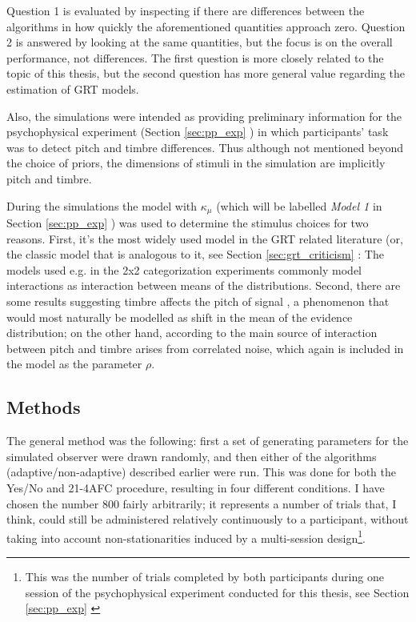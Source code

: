 \documentclass{article}\usepackage{knitr}
\begin{document}
Question 1 is evaluated by inspecting if there are differences between the algorithms in how quickly the aforementioned quantities approach zero. Question 2 is answered by looking at the same  quantities, but the focus is on the overall performance, not differences. The first question is more closely related to the topic of this thesis, but the second question has more general value regarding the estimation of GRT models. 

Also, the simulations were intended as providing preliminary information for the psychophysical experiment (Section \ref{sec:pp_exp} \textit{}) in which participants' task was to detect pitch and timbre differences. Thus although not mentioned beyond the choice of priors, the dimensions of stimuli in the simulation are implicitly pitch and timbre.

During the simulations the model with $\kappa_{\mu}$ (which will be labelled \textit{Model 1} in Section \ref{sec:pp_exp} \textit{}) was used to determine the stimulus choices for two reasons. First, it's the most widely used model in the GRT related literature (or, the classic model that is analogous to it, see Section \ref{sec:grt_criticism} \textit{}: The models used e.g. in the 2x2 categorization experiments commonly model interactions as interaction between means of the distributions. Second, there are some results suggesting timbre affects the pitch of signal \citep{allen2014, platt1985}, a phenomenon that would most naturally be modelled as shift in the mean of the evidence distribution; on the other hand, according to \cite{silbert2009} the main source of interaction between pitch and timbre arises from correlated noise, which again is included in the model as the parameter $\rho$.

\subsection{Methods}

The general method was the following: first a set of generating parameters for the simulated observer were drawn randomly, and then either of the algorithms (adaptive/non-adaptive) described earlier were run. This was done for both the Yes/No and 21-4AFC procedure, resulting in four different conditions. I have chosen the number 800 fairly arbitrarily; it represents a number of trials that, I think, could still be administered relatively continuously to a participant, without taking into account non-stationarities induced by a multi-session design\footnote{This was the number of trials completed by both participants during one session of the psychophysical experiment conducted for this thesis, see Section \ref{sec:pp_exp} \textit{}}. 
\end{document}
